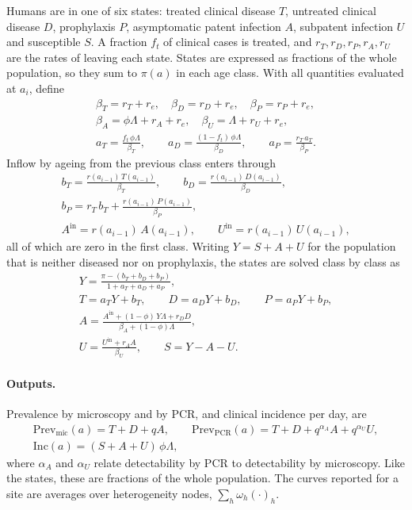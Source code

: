 Humans are in one of six states: treated clinical disease $T$, untreated clinical disease $D$, prophylaxis $P$, asymptomatic patent infection $A$, subpatent infection $U$ and susceptible $S$. A fraction $f_t$ of clinical cases is treated, and $r_T, r_D, r_P, r_A, r_U$ are the rates of leaving each state. States are expressed as fractions of the whole population, so they sum to $\pi(a)$ in each age class. With all quantities evaluated at $a_i$, define
\begin{gather*}
\beta_T = r_T + r_e, \quad
\beta_D = r_D + r_e, \quad
\beta_P = r_P + r_e, \\
\beta_A = \phi\Lambda + r_A + r_e, \quad
\beta_U = \Lambda + r_U + r_e, \\
a_T = \frac{f_t\,\phi\Lambda}{\beta_T}, \qquad
a_D = \frac{(1 - f_t)\,\phi\Lambda}{\beta_D}, \qquad
a_P = \frac{r_T\, a_T}{\beta_P}.
\end{gather*}
Inflow by ageing from the previous class enters through
\begin{gather*}
b_T = \frac{r(a_{i-1})\,T(a_{i-1})}{\beta_T}, \qquad
b_D = \frac{r(a_{i-1})\,D(a_{i-1})}{\beta_D}, \\
b_P = r_T\, b_T + \frac{r(a_{i-1})\,P(a_{i-1})}{\beta_P}, \\
A^{\mathrm{in}} = r(a_{i-1})\,A(a_{i-1}), \qquad
U^{\mathrm{in}} = r(a_{i-1})\,U(a_{i-1}),
\end{gather*}
all of which are zero in the first class. Writing $Y = S + A + U$ for the population that is neither diseased nor on prophylaxis, the states are solved class by class as
\begin{gather*}
Y = \frac{\pi - (b_T + b_D + b_P)}{1 + a_T + a_D + a_P}, \\
T = a_T Y + b_T, \qquad
D = a_D Y + b_D, \qquad
P = a_P Y + b_P, \\
A = \frac{A^{\mathrm{in}} + (1 - \phi)\,Y\Lambda + r_D D}{\beta_A + (1 - \phi)\Lambda}, \\
U = \frac{U^{\mathrm{in}} + r_A A}{\beta_U}, \qquad
S = Y - A - U.
\end{gather*}

\paragraph{Outputs.} Prevalence by microscopy and by PCR, and clinical incidence per day, are
\begin{gather*}
\mathrm{Prev}_{\mathrm{mic}}(a) = T + D + q A, \qquad
\mathrm{Prev}_{\mathrm{PCR}}(a) = T + D + q^{\alpha_A} A + q^{\alpha_U} U, \\
\mathrm{Inc}(a) = (S + A + U)\,\phi\Lambda,
\end{gather*}
where $\alpha_A$ and $\alpha_U$ relate detectability by PCR to detectability by microscopy. Like the states, these are fractions of the whole population. The curves reported for a site are averages over heterogeneity nodes, $\sum_h \omega_h (\cdot)_h$.

